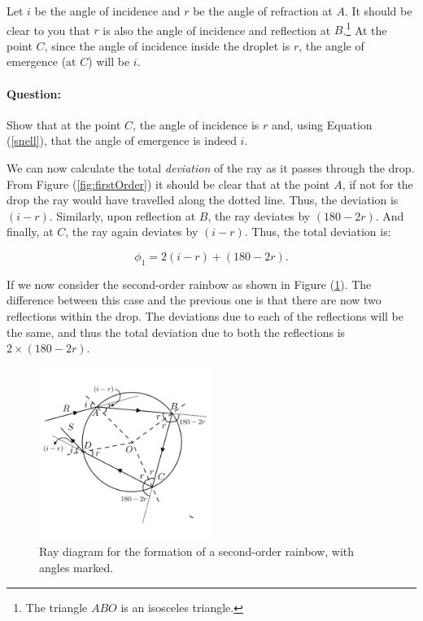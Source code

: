 Let $i$ be the angle of incidence and $r$ be the angle of refraction at $A$. It should be clear to you that $r$ is also the angle of incidence and reflection at $B$.\footnote{The triangle $ABO$ is an isosceles triangle.} At the point $C$, since the angle of incidence inside the droplet is $r$, the angle of emergence (at $C$) will be $i$. 

\begin{question}
\paragraph{Question:} Show that at the point $C$, the angle of incidence is $r$ and, using Equation (\ref{snell}), that the angle of emergence is indeed $i$.
\end{question}

We can now calculate the total \textit{deviation} of the ray as it passes through the drop. From Figure (\ref{fig:firstOrder}) it should be clear that at the point $A$, if not for the drop the ray would have travelled along the dotted line. Thus, the deviation is $(i-r)$. Similarly, upon reflection at $B$, the ray deviates by $(180-2r)$. And finally, at $C$, the ray again deviates by $(i-r)$. Thus, the total deviation is:

\begin{equation}
\phi_{1}=2(i-r)+(180-2r).
\end{equation}


If we now consider the second-order rainbow as shown in Figure (\ref{fig:secondOrder}). The difference between this case and the previous one is that there are now two reflections within the drop. The deviations due to each of the reflections will be the same, and thus the total deviation due to both the reflections is $2\times (180 - 2r)$. 


\begin{figure}[!htb]
    \centering
    \includegraphics[width=0.5\textwidth]{figs/rainbow2.png}
    \caption{Ray diagram for the formation of a second-order rainbow, with angles marked.}
    \label{fig:secondOrder}
\end{figure}



